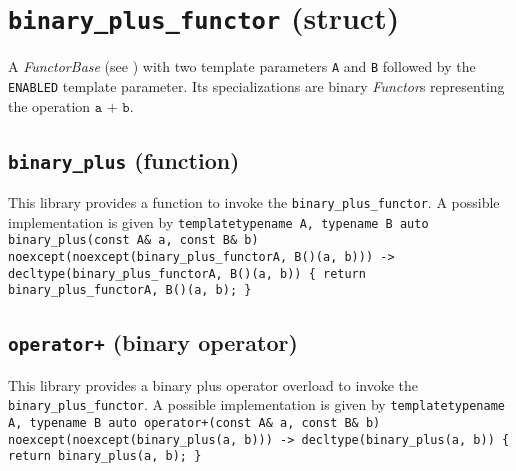 \section{\texttt{binary\_plus\_functor} (struct)}
A \textit{FunctorBase} (see \cite{functors}) with two template parameters \texttt{A} and \texttt{B} followed by the \texttt{ENABLED} template parameter.
Its specializations are binary \textit{Functor}s representing the operation $\texttt{a + b}$.

\subsection{\texttt{binary\_plus} (function)}
This library provides a function to invoke the \texttt{binary\_plus\_functor}.
A possible implementation is given by\newline
\texttt{template\textlangle typename A, typename B\textrangle\newline
auto\newline
binary\_plus(const A\& a, const B\& b)\newline
noexcept(noexcept(binary\_plus\_functor\textlangle A, B\textrangle()(a, b)))\newline
-> decltype(binary\_plus\_functor\textlangle A, B\textrangle()(a, b))\newline
\{ return binary\_plus\_functor\textlangle A, B\textrangle()(a, b); \}}

\subsection{\texttt{operator+} (binary operator)}
This library provides a binary plus operator overload to invoke the \texttt{binary\_plus\_functor}.
A possible implementation is given by\newline
\texttt{template\textlangle typename A, typename B\textrangle\newline
auto\newline
operator+(const A\& a, const B\& b)\newline
noexcept(noexcept(binary\_plus(a, b)))\newline
-> decltype(binary\_plus(a, b))\newline
\{ return binary\_plus(a, b); \}}

